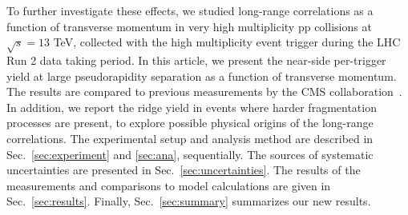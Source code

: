 % 

To further investigate these effects, we studied long-range correlations as a function of transverse momentum in very high multiplicity pp collisions at $\sqrt{s} =13$ TeV, collected with the high multiplicity event trigger during the LHC Run 2 data taking period. In this article, we present the near-side per-trigger yield at large pseudorapidity separation as a function of transverse momentum. The results are compared to previous measurements by the CMS collaboration~\cite{Khachatryan:2015lva}. In addition, we report the ridge yield in events where harder fragmentation processes are present, to explore possible physical origins of the long-range correlations.
The experimental setup and analysis method are described in Sec.~\ref{sec:experiment} and \ref{sec:ana}, sequentially. The sources of systematic uncertainties are presented in Sec.~\ref{sec:uncertainties}. The results of the measurements and comparisons to model calculations are given in Sec.~\ref{sec:results}. Finally, Sec.~\ref{sec:summary} summarizes our new results.

